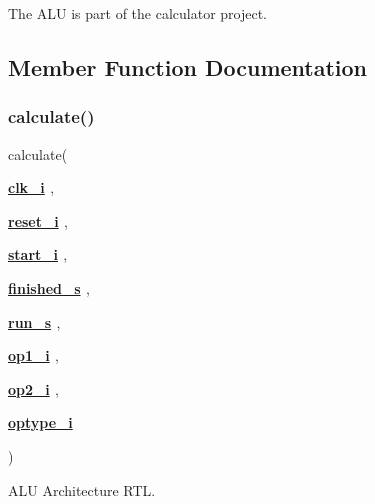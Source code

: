 The A\+LU is part of the calculator project. 

\subsection{Member Function Documentation}
\mbox{\label{classalu_1_1rtl_a127a47776b4d018774cd0c1842fb6038}} 
\subsubsection{\texorpdfstring{calculate()}{calculate()}}
{\footnotesize\ttfamily  {\bfseries \textcolor{vhdlchar}{ }} calculate(\begin{DoxyParamCaption}\item[{}]{{\bfseries {\bfseries \hyperlink{classalu_abe949478e3f8aad0a6aeb1842fa6c608}{clk\+\_\+i}} \textcolor{vhdlchar}{ }} {\em } ,  }\item[{}]{{\bfseries {\bfseries \hyperlink{classalu_a55da7e76960757f8c6842e86a28ee7be}{reset\+\_\+i}} \textcolor{vhdlchar}{ }} {\em } ,  }\item[{}]{{\bfseries {\bfseries \hyperlink{classalu_aba7911228d421cdfd5fc4eb74a60572c}{start\+\_\+i}} \textcolor{vhdlchar}{ }} {\em } ,  }\item[{}]{{\bfseries {\bfseries \hyperlink{classalu_1_1rtl_abb13f4e66b38434991c4a6e11a842d8e}{finished\+\_\+s}} \textcolor{vhdlchar}{ }} {\em } ,  }\item[{}]{{\bfseries {\bfseries \hyperlink{classalu_1_1rtl_af4334e2915fc133abca5cbbac4312fcf}{run\+\_\+s}} \textcolor{vhdlchar}{ }} {\em } ,  }\item[{}]{{\bfseries {\bfseries \hyperlink{classalu_a1127482098676cfc6ce7e98ba675ee27}{op1\+\_\+i}} \textcolor{vhdlchar}{ }} {\em } ,  }\item[{}]{{\bfseries {\bfseries \hyperlink{classalu_ae346648ed4ed2217b5e8d668b165aff2}{op2\+\_\+i}} \textcolor{vhdlchar}{ }} {\em } ,  }\item[{}]{{\bfseries {\bfseries \hyperlink{classalu_aee662ea38c86cd2e7dc1970ce8a6d5e9}{optype\+\_\+i}} \textcolor{vhdlchar}{ }} {\em } }\end{DoxyParamCaption})\hspace{0.3cm}{\ttfamily [Process]}}



A\+LU Architecture R\+TL. 

